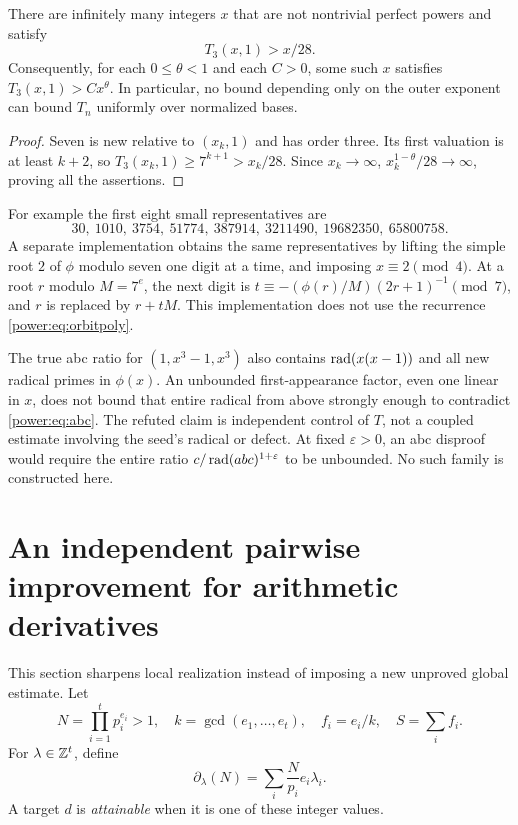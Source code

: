 \begin{corollary}\label{power:cor:linear}
There are infinitely many integers $x$ that are not nontrivial perfect
powers and satisfy
\begin{equation}\label{power:eq:lineart}
T_3(x,1)>x/28.
\end{equation}
Consequently, for each $0\le\theta<1$ and each $C>0$, some such $x$ satisfies
$T_3(x,1)>Cx^\theta$. In particular, no bound depending only on the outer
exponent can bound $T_n$ uniformly over normalized bases.
\end{corollary}
\begin{proof}
Seven is new relative to $(x_k,1)$ and has order three. Its first valuation
is at least $k+2$, so $T_3(x_k,1)\ge7^{k+1}>x_k/28$. Since $x_k\to\infty$,
$x_k^{1-\theta}/28\to\infty$, proving all the assertions.
\end{proof}

For example the first eight small representatives are
\[
30,\ 1010,\ 3754,\ 51774,\ 387914,\ 3211490,\ 19682350,\ 65800758.
\]
A separate implementation obtains the same representatives by lifting the
simple root $2$ of $\phi$ modulo seven one digit at a time, and imposing
$x\equiv2\pmod4$. At a root $r$ modulo $M=7^e$, the next digit is
$t\equiv-(\phi(r)/M)(2r+1)^{-1}\pmod7$, and $r$ is replaced by $r+tM$.
This implementation does not use the recurrence \eqref{power:eq:orbitpoly}.

\begin{remark}
The true abc ratio for $(1,x^3-1,x^3)$ also contains
$\operatorname{rad}(x(x-1))$ and all new radical primes in $\phi(x)$. An unbounded
first-appearance factor, even one linear in $x$, does not bound that entire
radical from above strongly enough to contradict \eqref{power:eq:abc}.
The refuted claim is independent control of $T$, not a coupled estimate
involving the seed's radical or defect. At fixed $\varepsilon>0$, an abc
disproof would require the entire ratio $c/\operatorname{rad}(abc)^{1+\varepsilon}$ to be
unbounded. No such family is constructed here.
\end{remark}

\section{An independent pairwise improvement for arithmetic derivatives}
This section sharpens local realization instead of imposing a new
unproved global estimate. Let
\[
N=\prod_{i=1}^t p_i^{e_i}>1,\quad
k=\gcd(e_1,\ldots,e_t),\quad f_i=e_i/k,\quad S=\sum_i f_i.
\]
For $\lambda\in\mathbb Z^t$, define
\[
\partial_\lambda(N)=\sum_i \frac{N}{p_i}e_i\lambda_i.
\]
A target $d$ is \emph{attainable} when it is one of these integer values.


